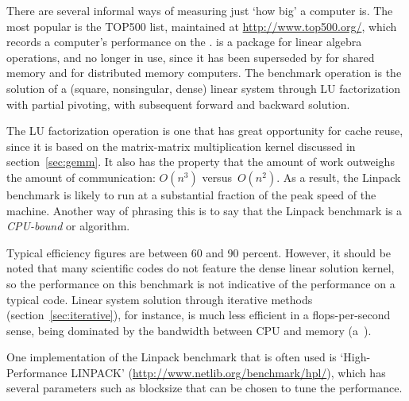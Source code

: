 
There are several informal ways of measuring just `how big' a computer
is. The most popular is the TOP500 list, maintained at
\url{http://www.top500.org/}, which records a computer's performance
on the .  is a
package for linear algebra operations, and no longer in use, since it
has been superseded by  for shared memory and
 for distributed memory computers. The benchmark
operation is the solution of a (square, nonsingular, dense) linear
system through LU factorization with partial pivoting, with subsequent
forward and backward solution.

The LU factorization operation is one that has great opportunity for
cache reuse, since it is based on the matrix-matrix multiplication
kernel discussed in section~\ref{sec:gemm}. It also has the property
that the amount of work outweighs the amount of communication:
$O(n^3)$ versus~$O(n^2)$.  As a result, the Linpack benchmark is
likely to run at a substantial fraction of the peak speed of the
machine. Another way of phrasing this is to say that the Linpack
benchmark is a \emph{CPU-bound} or 
algorithm.

Typical efficiency figures are between 60 and 90 percent. However, it
should be noted that many scientific codes do not feature the dense
linear solution kernel, so the performance on this benchmark is not
indicative of the performance on a typical code. Linear system
solution through iterative methods (section~\ref{sec:iterative}), for
instance, is much less efficient in a flops-per-second sense, being
dominated by the bandwidth between CPU and memory
(a~).

One implementation of the Linpack benchmark that is often used is
`High-Performance LINPACK'
(\url{http://www.netlib.org/benchmark/hpl/}), which has several
parameters such as blocksize that can be chosen to tune the performance.

